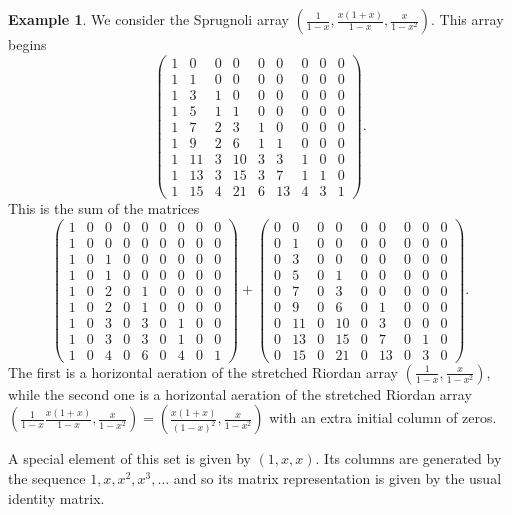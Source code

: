 \documentclass[12pt,reqno]{article}
\theoremstyle{definition}
\newtheorem{example}[theorem]{Example}
\begin{document}
\begin{example} We consider the Sprugnoli array $\left(\frac{1}{1-x}, \frac{x(1+x)}{1-x}, \frac{x}{1-x^2}\right)$. This array begins
$$\left(\begin{array}{ccccccccc}
1 & 0 & 0 & 0 & 0 & 0 & 0 & 0 & 0 \\
1 & 1 & 0 & 0 & 0 & 0 & 0 & 0 & 0 \\
1 & 3 & 1 & 0 & 0 & 0 & 0 & 0 & 0 \\
1 & 5 & 1 & 1 & 0 & 0 & 0 & 0 & 0 \\
1 & 7 & 2 & 3 & 1 & 0 & 0 & 0 & 0 \\
1 & 9 & 2 & 6 & 1 & 1 & 0 & 0 & 0 \\
1 & 11 & 3 & 10 & 3 & 3 & 1 & 0 & 0 \\
1 & 13 & 3 & 15 & 3 & 7 & 1 & 1 & 0 \\
1 & 15 & 4 & 21 & 6 & 13 & 4 & 3 & 1
\end{array}\right).$$ This is the sum of the matrices
$$\left(\begin{array}{ccccccccc}
1 & 0 & 0 & 0 & 0 & 0 & 0 & 0 & 0 \\
1 & 0 & 0 & 0 & 0 & 0 & 0 & 0 & 0 \\
1 & 0 & 1 & 0 & 0 & 0 & 0 & 0 & 0 \\
1 & 0 & 1 & 0 & 0 & 0 & 0 & 0 & 0 \\
1 & 0 & 2 & 0 & 1 & 0 & 0 & 0 & 0 \\
1 & 0 & 2 & 0 & 1 & 0 & 0 & 0 & 0 \\
1 & 0 & 3 & 0 & 3 & 0 & 1 & 0 & 0 \\
1 & 0 & 3 & 0 & 3 & 0 & 1 & 0 & 0 \\
1 & 0 & 4 & 0 & 6 & 0 & 4 & 0 & 1
\end{array}\right)+
\left(\begin{array}{ccccccccc}
0 & 0 & 0 & 0 & 0 & 0 & 0 & 0 & 0 \\
0 & 1 & 0 & 0 & 0 & 0 & 0 & 0 & 0 \\
0 & 3 & 0 & 0 & 0 & 0 & 0 & 0 & 0 \\
0 & 5 & 0 & 1 & 0 & 0 & 0 & 0 & 0 \\
0 & 7 & 0 & 3 & 0 & 0 & 0 & 0 & 0 \\
0 & 9 & 0 & 6 & 0 & 1 & 0 & 0 & 0 \\
0 & 11 & 0 & 10 & 0 & 3 & 0 & 0 & 0 \\
0 & 13 & 0 & 15 & 0 & 7 & 0 & 1 & 0 \\
0 & 15 & 0 & 21 & 0 & 13 & 0 & 3 & 0
\end{array}\right).$$
The first is a horizontal aeration of the stretched Riordan array $\left(\frac{1}{1-x},\frac{x}{1-x^2}\right)$, while the second one
is a horizontal aeration of the stretched Riordan array $\left(\frac{1}{1-x} \frac{x(1+x)}{1-x},\frac{x}{1-x^2}\right)=\left(\frac{x(1+x)}{(1-x)^2},\frac{x}{1-x^2}\right)$ with an extra initial column of zeros.
\end{example}
A special element of this set is given by $(1,x,x)$. Its columns are generated by the sequence $1,x,x^2,x^3,\ldots$ and so its matrix representation is  given by the usual identity matrix.
\end{document}

